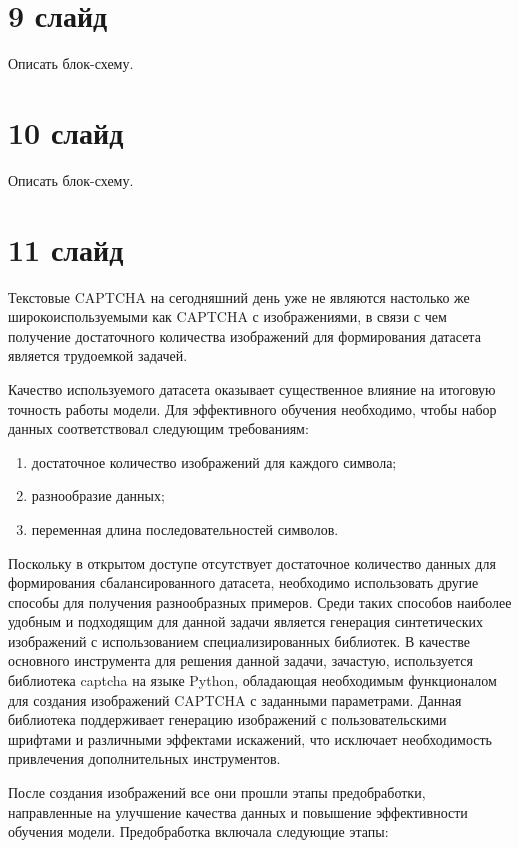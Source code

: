 \documentclass{altsu-report}
\begin{document}
\section*{9 слайд}

Описать блок-схему.

\section*{10 слайд}

Описать блок-схему.

\section*{11 слайд}

Текстовые CAPTCHA на сегодняшний день уже не являются настолько же 
широкоиспользуемыми как CAPTCHA с изображениями, в связи с чем получение 
достаточного количества изображений для формирования датасета является трудоемкой 
задачей.

Качество используемого датасета оказывает существенное влияние на итоговую 
точность работы модели. Для эффективного обучения необходимо, чтобы набор данных 
соответствовал следующим требованиям:

\begin{enumerate}
    \item достаточное количество изображений для каждого символа;
    \item разнообразие данных;
    \item переменная длина последовательностей символов.
\end{enumerate}

Поскольку в открытом доступе отсутствует достаточное количество данных для 
формирования сбалансированного датасета, необходимо использовать другие способы 
для получения разнообразных примеров. Среди таких способов наиболее удобным и 
подходящим для данной задачи является генерация синтетических изображений с 
использованием специализированных библиотек. В качестве основного инструмента 
для решения данной задачи, зачастую, используется библиотека captcha на языке 
Python, обладающая необходимым функционалом для создания изображений CAPTCHA с 
заданными параметрами. Данная библиотека поддерживает генерацию изображений с 
пользовательскими шрифтами и различными эффектами искажений, что исключает 
необходимость привлечения дополнительных инструментов.

После создания изображений все они прошли этапы предобработки, направленные на 
улучшение качества данных и повышение эффективности обучения модели. 
Предобработка включала следующие этапы:
\end{document}
